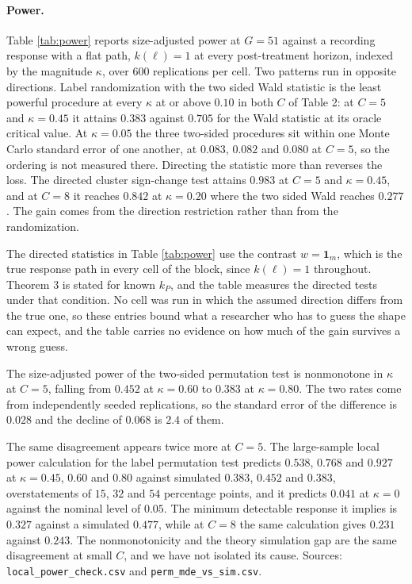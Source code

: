 \documentclass[12pt]{article}
\theoremstyle{definition}
\numberwithin{equation}{section}
\begin{document}
\paragraph{Power.} Table \ref{tab:power} reports size-adjusted power at
$G = 51$ against a recording response with a flat path, $k(\ell) = 1$ at every
post-treatment horizon, indexed by the magnitude $\kappa$, over $600$
replications per cell. Two patterns run in opposite directions. Label
randomization with the two sided Wald statistic is the least powerful
procedure at every $\kappa$ at or above $0.10$ in both $C$ of Table
2: at $C = 5$ and $\kappa = 0.45$ it attains $0.383$ against
$0.705$ for the Wald statistic at its oracle critical value. At
$\kappa = 0.05$ the three two-sided procedures sit within one Monte Carlo
standard error of one another, at $0.083$, $0.082$ and $0.080$ at $C = 5$, so
the ordering is not measured there. Directing the statistic more than reverses
the loss. The directed cluster sign-change test attains $0.983$ at $C = 5$ and
$\kappa = 0.45$, and at $C = 8$ it reaches $0.842$ at $\kappa = 0.20$ where the
two sided Wald reaches $0.277$. The gain comes from the direction restriction
rather than from the randomization.

The directed statistics in Table \ref{tab:power} use the contrast $w =
\mathbf{1}_m$, which is the true response path in every cell of the block,
since $k(\ell) = 1$ throughout. Theorem 3 is stated for known
$k_P$, and the table measures the directed tests under that condition.
No cell was run in which the assumed direction differs from the true one, so
these entries bound what a researcher who has to guess the shape can expect,
and the table carries no evidence on how much of the gain survives a wrong
guess.

The size-adjusted power of the two-sided permutation test is nonmonotone in
$\kappa$ at $C = 5$, falling from $0.452$ at $\kappa = 0.60$ to $0.383$ at
$\kappa = 0.80$. The two rates come from independently seeded replications, so
the standard error of the difference is $0.028$ and the decline of $0.068$ is
$2.4$ of them.

The same disagreement appears twice more at $C = 5$. The large-sample local
power calculation for the label permutation test predicts $0.538$, $0.768$ and
$0.927$ at $\kappa = 0.45$, $0.60$ and $0.80$ against simulated $0.383$,
$0.452$ and $0.383$, overstatements of $15$, $32$ and $54$ percentage points,
and it predicts $0.041$ at $\kappa = 0$ against the nominal level of $0.05$. The
minimum detectable response it implies is $0.327$ against a simulated $0.477$,
while at $C = 8$ the same calculation gives $0.231$ against $0.243$. The
nonmonotonicity and the theory simulation gap are the same disagreement at
small $C$, and we have not isolated its cause. Sources:
\texttt{local\_power\_check.csv} and \texttt{perm\_mde\_vs\_sim.csv}.
\end{document}
